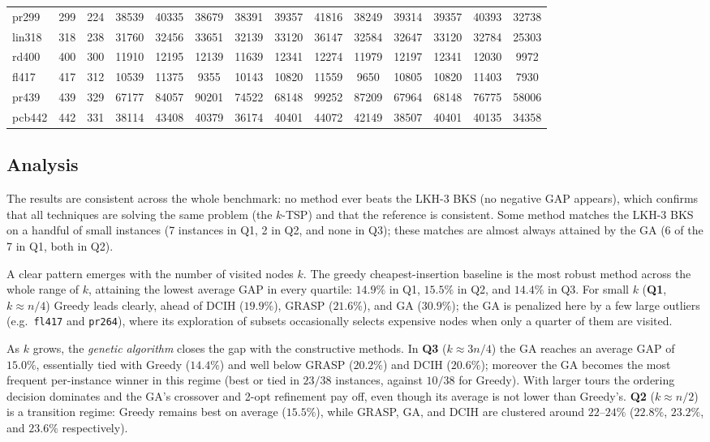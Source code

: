 \documentclass[conference]{IEEEtran}
\begin{document}
\begin{table}[htbp]
{{\begin{tabular}{|l|c|c|c|c|c|c|c|c|c|c|c|c|c|}
pr299 & 299 & 224 & 38539 & 40335 & 38679 & 38391 & 39357 & 41816 & 38249 & 39314 & 39357 & 40393 & 32738 \\
lin318 & 318 & 238 & 31760 & 32456 & 33651 & 32139 & 33120 & 36147 & 32584 & 32647 & 33120 & 32784 & 25303 \\
rd400 & 400 & 300 & 11910 & 12195 & 12139 & 11639 & 12341 & 12274 & 11979 & 12197 & 12341 & 12030 & 9972 \\
fl417 & 417 & 312 & 10539 & 11375 & 9355 & 10143 & 10820 & 11559 & 9650 & 10805 & 10820 & 11403 & 7930 \\
pr439 & 439 & 329 & 67177 & 84057 & 90201 & 74522 & 68148 & 99252 & 87209 & 67964 & 68148 & 76775 & 58006 \\
pcb442 & 442 & 331 & 38114 & 43408 & 40379 & 36174 & 40401 & 44072 & 42149 & 38507 & 40401 & 40135 & 34358 \\
\hline
\end{tabular}}}
\end{table}

\subsection*{Analysis}
The results are consistent across the whole benchmark: no method ever beats the LKH-3 BKS (no negative GAP appears), which confirms that all techniques are solving the same problem (the $k$-TSP) and that the reference is consistent. Some method matches the LKH-3 BKS on a handful of small instances (7 instances in Q1, 2 in Q2, and none in Q3); these matches are almost always attained by the GA (6 of the 7 in Q1, both in Q2).

A clear pattern emerges with the number of visited nodes $k$. The greedy cheapest-insertion baseline is the most robust method across the whole range of $k$, attaining the lowest average GAP in every quartile: $14.9\%$ in Q1, $15.5\%$ in Q2, and $14.4\%$ in Q3. For small $k$ (\textbf{Q1}, $k\approx n/4$) Greedy leads clearly, ahead of DCIH ($19.9\%$), GRASP ($21.6\%$), and GA ($30.9\%$); the GA is penalized here by a few large outliers (e.g.\ \texttt{fl417} and \texttt{pr264}), where its exploration of subsets occasionally selects expensive nodes when only a quarter of them are visited.

As $k$ grows, the \emph{genetic algorithm} closes the gap with the constructive methods. In \textbf{Q3} ($k\approx 3n/4$) the GA reaches an average GAP of $15.0\%$, essentially tied with Greedy ($14.4\%$) and well below GRASP ($20.2\%$) and DCIH ($20.6\%$); moreover the GA becomes the most frequent per-instance winner in this regime (best or tied in $23/38$ instances, against $10/38$ for Greedy). With larger tours the ordering decision dominates and the GA's crossover and 2-opt refinement pay off, even though its average is not lower than Greedy's. \textbf{Q2} ($k\approx n/2$) is a transition regime: Greedy remains best on average ($15.5\%$), while GRASP, GA, and DCIH are clustered around $22$--$24\%$ ($22.8\%$, $23.2\%$, and $23.6\%$ respectively).
\end{document}
